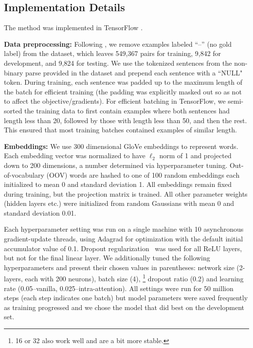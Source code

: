 \documentclass[11pt,letterpaper]{article}
\begin{document}
\subsection{Implementation Details}
The method was implemented in TensorFlow \cite{abaditensorflow}.

\textbf{Data preprocessing:} Following , we remove examples labeled ``--'' (no gold label) from the dataset, which leaves 549,367 pairs for training, 9,842 for development, and 9,824 for testing. We use the tokenized sentences from the non-binary parse provided in the dataset and prepend each sentence with a ``NULL" token. During training, each sentence was padded up to the maximum length of the batch for efficient training (the padding was explicitly masked out so as not to affect the objective/gradients). For efficient batching in TensorFlow, we semi-sorted the training data to first contain examples where both sentences had length less than 20, followed by those with length less than 50, and then the rest. This ensured that most training batches contained examples of similar length.

\textbf{Embeddings: } We use 300 dimensional GloVe embeddings \cite{pennington2014glove} to represent words. Each embedding vector was normalized to have $\ell_2$ norm of 1 and projected down to 200 dimensions, a number determined via hyperparameter tuning. Out-of-vocabulary (OOV) words are hashed to one of 100 random embeddings each initialized to mean 0 and standard deviation 1. All embeddings remain fixed during training, but the projection matrix is trained. All other parameter weights (hidden layers etc.) were initialized from random Gaussians with mean 0 and standard deviation 0.01.

Each hyperparameter setting was run on a single machine with 10 asynchronous gradient-update threads, using Adagrad \cite{duchi2011adaptive} for optimization with the default initial accumulator value of 0.1. Dropout regularization~\cite{srivastava2014dropout} was used for all ReLU layers, but not for the final linear layer. We additionally tuned the following hyperparameters and present their chosen values in parentheses: network size (2-layers, each with 200 neurons), batch size (4), \footnote{16 or 32 also work well and are a bit more stable.} dropout ratio (0.2) and learning rate (0.05--vanilla, 0.025--intra-attention). All settings were run for 50 million steps (each step indicates one batch) but model parameters were saved frequently as training progressed and we chose the model that did best on the development set.
\end{document}
